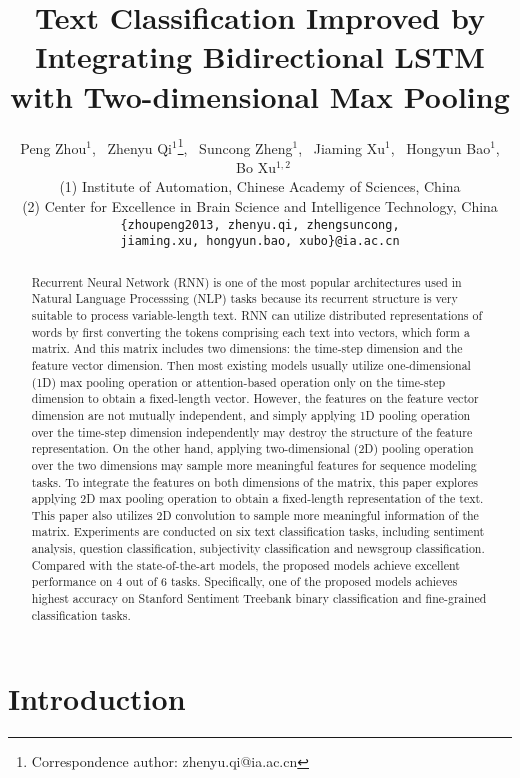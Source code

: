 \documentclass[11pt]{article}
\title{Text Classification Improved by Integrating Bidirectional LSTM\\ with Two-dimensional Max Pooling}
\author{Peng Zhou$^{1}$, \ Zhenyu Qi$^{1}$\thanks{Correspondence author: zhenyu.qi@ia.ac.cn}, \ Suncong Zheng$^{1}$, \ Jiaming Xu$^{1}$, \ Hongyun Bao$^{1}$, \ Bo Xu$^{1,2}$ \\
  (1) Institute of Automation, Chinese Academy of Sciences, China \\(2) Center for Excellence in Brain Science and Intelligence Technology, China\\
  {\tt \{zhoupeng2013, zhenyu.qi, zhengsuncong,} \\
          {\tt jiaming.xu, hongyun.bao, xubo\}@ia.ac.cn}}
\date{}
\begin{document}
\maketitle
\begin{abstract}
Recurrent Neural Network (RNN) is one of the most popular architectures used in Natural Language Processsing (NLP) tasks because its recurrent structure is very suitable to process variable-length text. RNN can utilize distributed representations of words by first converting the tokens comprising each text into vectors, which form a matrix. And this matrix includes two dimensions: the time-step dimension and the feature vector dimension. Then most existing models usually utilize one-dimensional (1D) max pooling operation or attention-based operation only on the time-step dimension to obtain a fixed-length vector. 
However, the features on the feature vector dimension are not mutually independent, and simply applying 1D pooling operation over the time-step dimension independently may destroy the structure of the feature representation. On the other hand, applying two-dimensional (2D) pooling operation over the two dimensions may sample more meaningful features for sequence modeling tasks. To integrate the features on both dimensions of the matrix, this paper explores applying 2D max pooling operation to obtain a fixed-length representation of the text. This paper also utilizes 2D convolution to sample more meaningful information of the matrix. Experiments are conducted on six text classification tasks, including sentiment analysis, question classification, subjectivity classification and newsgroup classification. Compared with the state-of-the-art models, the proposed models achieve excellent performance on 4 out of 6 tasks. Specifically, one of the proposed models achieves highest accuracy on Stanford Sentiment Treebank binary classification and fine-grained classification tasks.






\end{abstract}

\section{Introduction}
\end{document}
